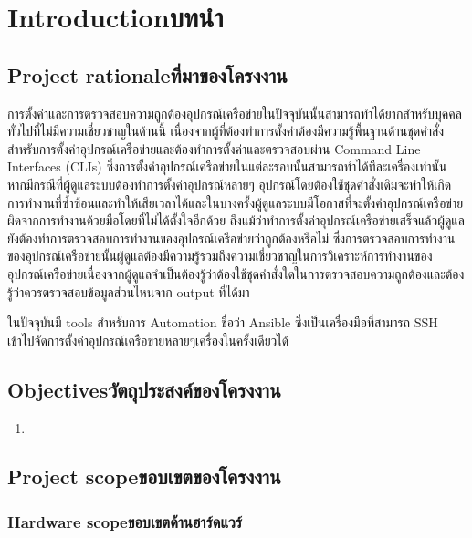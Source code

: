 \chapter{\ifenglish Introduction\else บทนำ\fi}

\section{\ifenglish Project rationale\else ที่มาของโครงงาน\fi}
\hspace{0.5in}
การตั้งค่าและการตรวจสอบความถูกต้องอุปกรณ์เครือข่ายในปัจจุบันนั้นสามารถทำได้ยากสำหรับบุคคลทั่วไปที่ไม่มีความเชี่ยวชาญในด้านนี้ เนื่องจากผู้ที่ต้องทำการตั้งค่าต้องมีความรู้พื้นฐานด้านชุดคำสั่งสำหรับการตั้งค่าอุปกรณ์เครือข่ายและต้องทำการตั้งค่าและตรวจสอบผ่าน Command Line Interfaces (CLIs) ซึ่งการตั้งค่าอุปกรณ์เครือข่ายในแต่ละรอบนั้นสามารถทำได้ทีละเครื่องเท่านั้น หากมีกรณีที่ผู้ดูแลระบบต้องทำการตั้งค่าอุปกรณ์หลายๆ อุปกรณ์โดยต้องใช้ชุดคำสั่งเดิมจะทำให้เกิดการทำงานที่ซ้ำซ้อนและทำให้เสียเวลาได้และในบางครั้งผู้ดูแลระบบมีโอกาสที่จะตั้งค่าอุปกรณ์เครือข่ายผิดจากการทำงานด้วยมือโดยที่ไม่ได้ตั้งใจอีกด้วย
ถึงแม้ว่าทำการตั้งค่าอุปกรณ์เครือข่ายเสร็จแล้วผู้ดูแลยังต้องทำการตรวจสอบการทำงานของอุปกรณ์เครือข่ายว่าถูกต้องหรือไม่ ซึ่งการตรวจสอบการทำงานของอุปกรณ์เครือข่ายนั้นผู้ดูแลต้องมีความรู้รวมถึงความเชี่ยวชาญในการวิเคราะห์การทำงานของอุปกรณ์เครือข่ายเนื่องจากผู้ดูแลจำเป็นต้องรู้ว่าต้องใช้ชุดคำสั่งใดในการตรวจสอบความถูกต้องและต้องรู้ว่าควรตรวจสอบข้อมูลส่วนไหนจาก output ที่ได้มา

\hspace{0.5in}
ในปัจจุบันมี tools สำหรับการ Automation ชื่อว่า Ansible ซึ่งเป็นเครื่องมือที่สามารถ SSH เข้าไปจัดการตั้งค่าอุปกรณ์เครือข่ายหลายๆเครื่องในครั้งเดียวได้ 
\section{\ifenglish Objectives\else วัตถุประสงค์ของโครงงาน\fi}
\begin{enumerate}
    \item
\end{enumerate}

\section{\ifenglish Project scope\else ขอบเขตของโครงงาน\fi}

\subsection{\ifenglish Hardware scope\else ขอบเขตด้านฮาร์ดแวร์\fi}

